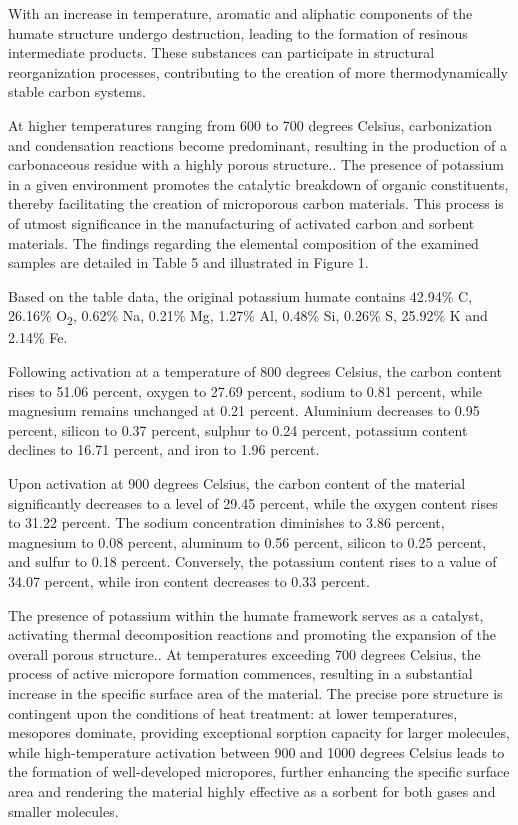 \begin{multicols}{2}
With an increase in temperature, aromatic and aliphatic components of
the humate structure undergo destruction, leading to the formation of
resinous intermediate products. These substances can participate in
structural reorganization processes, contributing to the creation of
more thermodynamically stable carbon systems.

At higher temperatures ranging from 600 to 700 degrees Celsius,
carbonization and condensation reactions become predominant, resulting
in the production of a carbonaceous residue with a highly porous
structure.. The presence of potassium in a given environment promotes
the catalytic breakdown of organic constituents, thereby facilitating
the creation of microporous carbon materials. This process is of utmost
significance in the manufacturing of activated carbon and sorbent
materials. The findings regarding the elemental composition of the
examined samples are detailed in Table 5 and illustrated in Figure 1.

Based on the table data, the original potassium humate contains 42.94\%
C, 26.16\% O\textsubscript{2}, 0.62\% Na, 0.21\% Mg, 1.27\% Al, 0.48\%
Si, 0.26\% S, 25.92\% K and 2.14\% Fe.

Following activation at a temperature of 800 degrees Celsius, the carbon
content rises to 51.06 percent, oxygen to 27.69 percent, sodium to 0.81
percent, while magnesium remains unchanged at 0.21 percent. Aluminium
decreases to 0.95 percent, silicon to 0.37 percent, sulphur to 0.24
percent, potassium content declines to 16.71 percent, and iron to 1.96
percent.

Upon activation at 900 degrees Celsius, the carbon content of the
material significantly decreases to a level of 29.45 percent, while the
oxygen content rises to 31.22 percent. The sodium concentration
diminishes to 3.86 percent, magnesium to 0.08 percent, aluminum to 0.56
percent, silicon to 0.25 percent, and sulfur to 0.18 percent.
Conversely, the potassium content rises to a value of 34.07 percent,
while iron content decreases to 0.33 percent.

The presence of potassium within the humate framework serves as a
catalyst, activating thermal decomposition reactions and promoting the
expansion of the overall porous structure.. At temperatures exceeding
700 degrees Celsius, the process of active micropore formation
commences, resulting in a substantial increase in the specific surface
area of the material. The precise pore structure is contingent upon the
conditions of heat treatment: at lower temperatures, mesopores dominate,
providing exceptional sorption capacity for larger molecules, while
high-temperature activation between 900 and 1000 degrees Celsius leads
to the formation of well-developed micropores, further enhancing the
specific surface area and rendering the material highly effective as a
sorbent for both gases and smaller molecules.


\end{multicols}
